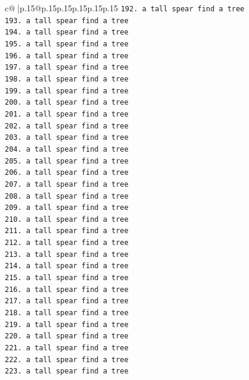 \documentclass{article}
\begin{document}
{\begin{supertabular}{c@{$\;$}|p{.15\linewidth}@{}p{.15\linewidth}p{.15\linewidth}p{.15\linewidth}p{.15\linewidth}p{.15\linewidth}}
{{{\texttt{192. a tall spear find a tree} \\
\texttt{193. a tall spear find a tree} \\
\texttt{194. a tall spear find a tree} \\
\texttt{195. a tall spear find a tree} \\
\texttt{196. a tall spear find a tree} \\
\texttt{197. a tall spear find a tree} \\
\texttt{198. a tall spear find a tree} \\
\texttt{199. a tall spear find a tree} \\
\texttt{200. a tall spear find a tree} \\
\texttt{201. a tall spear find a tree} \\
\texttt{202. a tall spear find a tree} \\
\texttt{203. a tall spear find a tree} \\
\texttt{204. a tall spear find a tree} \\
\texttt{205. a tall spear find a tree} \\
\texttt{206. a tall spear find a tree} \\
\texttt{207. a tall spear find a tree} \\
\texttt{208. a tall spear find a tree} \\
\texttt{209. a tall spear find a tree} \\
\texttt{210. a tall spear find a tree} \\
\texttt{211. a tall spear find a tree} \\
\texttt{212. a tall spear find a tree} \\
\texttt{213. a tall spear find a tree} \\
\texttt{214. a tall spear find a tree} \\
\texttt{215. a tall spear find a tree} \\
\texttt{216. a tall spear find a tree} \\
\texttt{217. a tall spear find a tree} \\
\texttt{218. a tall spear find a tree} \\
\texttt{219. a tall spear find a tree} \\
\texttt{220. a tall spear find a tree} \\
\texttt{221. a tall spear find a tree} \\
\texttt{222. a tall spear find a tree} \\
\texttt{223. a tall spear find a tree} \\
}}}
\end{supertabular}}
\end{document}
